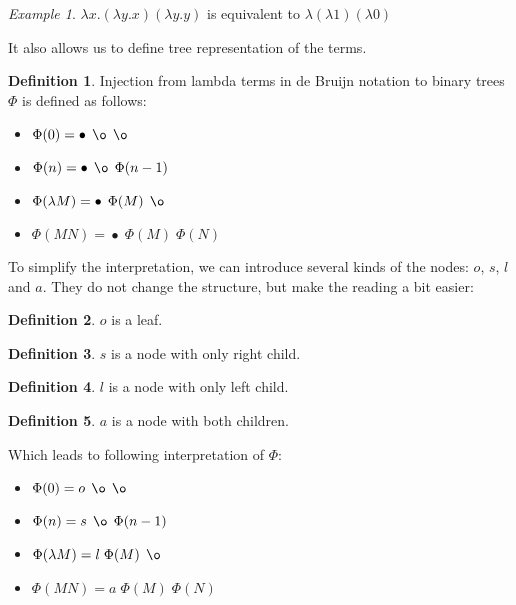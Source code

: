 \documentclass[final]{article}
\theoremstyle{definition}
\newtheorem{definition}{Definition}[subsection]
\theoremstyle{remark}
\newtheorem{example}{Example}[subsection]
\DeclareMathOperator{\n}{\bullet}
\DeclareMathOperator{\no}{\o}
\begin{document}
\begin{example}
    \(\lambda x . (\lambda y . x) (\lambda y . y)\) is equivalent to \(\lambda (\lambda 1) (\lambda 0)\)
\end{example}

It also allows us to define tree representation of the terms.

\begin{definition}
    Injection from lambda terms in de Bruijn notation to binary trees \(\Phi\) is defined as follows:
    \begin{itemize}
        \item \(\Phi(0) = \n\; \no\; \no\)
        \item \(\Phi(n) = \n\; \no\; \Phi(n - 1)\)
        \item \(\Phi(\lambda M) = \n\; \Phi(M)\; \no\)
        \item \(\Phi(M N) = \n\; \Phi(M)\; \Phi(N)\)
    \end{itemize}
\end{definition}

To simplify the interpretation, we can introduce several kinds of the nodes: \(o\), \(s\), \(l\) and \(a\). They do not change the structure, but make the reading a bit easier:

\begin{definition}
    \(o\) is a leaf.
\end{definition}

\begin{definition}
    \(s\) is a node with only right child.
\end{definition}

\begin{definition}
    \(l\) is a node with only left child.
\end{definition}

\begin{definition}
    \(a\) is a node with both children.
\end{definition}

Which leads to following interpretation of \(\Phi\):

\begin{itemize}
    \item \(\Phi(0) = o\; \no\; \no\)
    \item \(\Phi(n) = s\; \no\; \Phi(n - 1)\)
    \item \(\Phi(\lambda M) = l\; \Phi(M)\; \no\)
    \item \(\Phi(M N) = a\; \Phi(M)\; \Phi(N)\)
\end{itemize}
\end{document}

